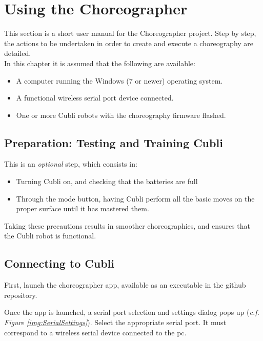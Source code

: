 \chapter{Using the Choreographer}\label{sec:usingthe}

This section is a short user manual for the Choreographer project.
Step by step, the actions to be undertaken in order to create and execute a choreography are detailed.\\

In this chapter it is assumed that the following are available:
\begin{itemize}
\item A computer running the Windows (7 or newer) operating system.
\item A functional wireless serial port device connected.
\item One or more Cubli robots with the choreography firmware flashed.
\end{itemize}

\section{Preparation: Testing and Training Cubli}

This is an \textit{optional} step, which consists in:

\begin{itemize}
\item[] Turning Cubli on, and checking that the batteries are full
\item[] Through the mode button, having Cubli perform all the basic moves on the proper surface until it has mastered them.
\end{itemize}

Taking these precautions results in smoother choreographies, and ensures that the Cubli robot is functional.

\section{Connecting to Cubli}

First, launch the choreographer app, available as an executable in the github repository.

Once the app is launched, a serial port selection and settings dialog pops up (\textit{c.f. Figure \ref{img:SerialSettings}}). Select the appropriate serial port. It must correspond to a wireless serial device connected to the pc.

